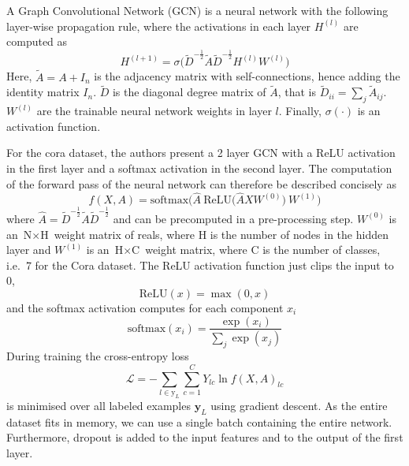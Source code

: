 \documentclass[12pt]{article}
\theoremstyle{definition}
\begin{document}
\bigskip

A Graph Convolutional Network (GCN) is a neural network with the following layer-wise propagation rule, where the activations in each layer $H^{(l)}$ are computed as
\[
H^{(l+1)} = \sigma \big( \tilde{D}^{-\frac{1}{2}} \tilde{A} \tilde{D}^{-\frac{1}{2}} H^{(l)} W^{(l)}\big)
\]
Here, $\tilde{A} = A + I_n$ is the adjacency matrix with self-connections, hence adding the identity matrix $I_n$. $\tilde{D}$ is the diagonal degree matrix of $\tilde{A}$, that is $\tilde{D}_{ii} = \sum_{j} \tilde{A}_{ij}$. $W^{(l)}$ are the trainable neural network weights in layer $l$. Finally, $\sigma(\cdot)$ is an activation function.

\bigskip

For the cora dataset, the authors present a 2 layer GCN with a ReLU activation in the first layer and a softmax activation in the second layer. The computation of the forward pass of the neural network can therefore be described concisely as
\[
f(X,A) = \textrm{softmax}\big(\hat{A}\ \textrm{ReLU}\big( \hat{A} X W^{(0)} \big)\ W^{(1)} \big)
\]
where $\hat{A} = \tilde{D}^{-\frac{1}{2}} \tilde{A} \tilde{D}^{-\frac{1}{2}}$ and can be precomputed in a pre-processing step. $W^{(0)}$ is an $\textrm{N} \times \textrm{H}$ weight matrix of reals, where H is the number of nodes in the hidden layer and $W^{(1)}$ is an $\textrm{H} \times \textrm{C}$ weight matrix, where C is the number of classes, i.e.\ 7  for the Cora dataset. The ReLU activation function just clips the input to 0,
\[
\textrm{ReLU}(x) = \max(0, x)
\]
and the softmax activation computes for each component $x_i$
\[
\textrm{softmax}(x_i) = \frac{\exp(x_i)}{\sum_j \exp(x_j)}
\]
During training the cross-entropy loss 
\[
\mathcal{L} = - \sum_{l \in \textrm{y}_L} \sum_{c=1}^{C} Y_{lc} \ln f(X,A)_{lc}
\]
is minimised over all labeled examples $\textbf{y}_L$ using gradient descent. As the entire dataset fits in memory, we can use a single batch containing the entire network. Furthermore, dropout \cite{srivastava2014dropout} is added to the input features and to the output of the first layer.
\end{document}
